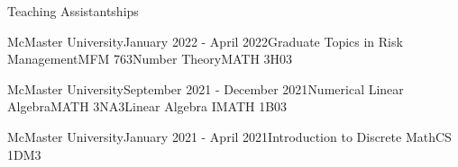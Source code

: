 \begin{rSection}{Teaching Assistantships}

\begin{taSubsectionFull}{McMaster University}{January 2022 - April 2022}{Graduate Topics in Risk Management}{MFM 763}{Number Theory}{MATH 3H03}
\end{taSubsectionFull}

\begin{taSubsectionFull}{McMaster University}{September 2021 - December 2021}{Numerical Linear Algebra}{MATH 3NA3}{Linear Algebra I}{MATH 1B03}
\end{taSubsectionFull}

\begin{taSubsectionMin}{McMaster University}{January 2021 - April 2021}{Introduction to Discrete Math}{CS 1DM3}
\end{taSubsectionMin}

\end{rSection}